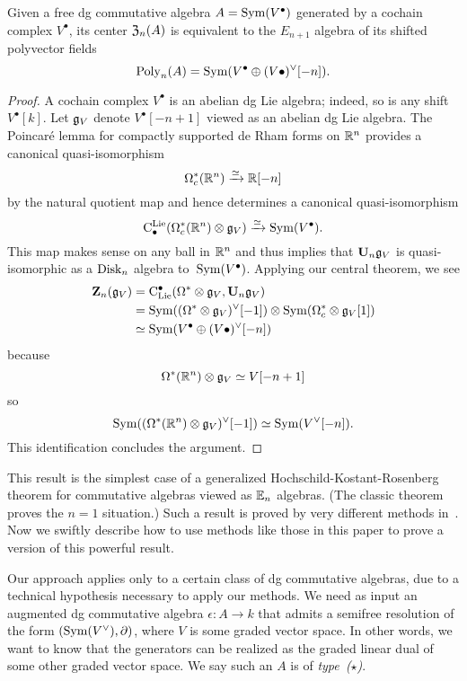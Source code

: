 \documentclass[11pt]{amsart}
\numberwithin{equation}{section}
\begin{document}
\begin{prp}
Given a free dg commutative algebra $A = {\rm Sym}(V^\bullet)$ generated by a cochain complex $V^\bullet$,
its center ${\frak Z}_n(A)$ is equivalent to the $E_{n+1}$ algebra of its shifted polyvector fields 
\[
{\rm Poly}_n(A) = {\rm Sym}(V^\bullet \oplus (V\bullet)^\vee[-n]).
\]
\end{prp}

\begin{proof}
A cochain complex $V^\bullet$ is an abelian dg Lie algebra;
indeed, so is any shift $V^\bullet[k]$. 
Let $\mathfrak g_V$ denote $V^\bullet[-n+1]$ viewed as an abelian dg Lie algebra.
The Poincar\'e lemma for compactly supported de Rham forms on $\mathbb R^n$ provides a canonical quasi-isomorphism
\[
\Omega^*_c(\mathbb R^n) \xrightarrow{\simeq} \mathbb R[-n]
\]
by the natural quotient map and hence determines a canonical quasi-isomorphism
\[
{\rm C}^{\rm Lie}_\bullet(\Omega^*_c(\mathbb R^n) \otimes \mathfrak g_V) \xrightarrow{\simeq} {\rm Sym}(V^\bullet).
\]
This map makes sense on any ball in $\mathbb R^n$ and thus implies that $\mathbf U_n \mathfrak g_V$ is quasi-isomorphic as a ${\rm Disk}_n$ algebra to~${\rm Sym}(V^\bullet)$.
Applying our central theorem, we see
\begin{align*}
\mathbf Z_n(\mathfrak g_V) &= {\rm C}_{\rm Lie}^\bullet(\Omega^* \otimes \mathfrak g_V, \mathbf U_n \mathfrak g_V) \\
&= {\rm Sym}((\Omega^* \otimes \mathfrak g_V)^\vee[-1]) \otimes {\rm Sym}(\Omega^*_c \otimes \mathfrak g_V[1])\\
& \simeq {\rm Sym}(V^\bullet \oplus (V\bullet)^\vee[-n])
\end{align*}
because
\[
\Omega^*(\mathbb R^n) \otimes \mathfrak g_V \simeq V[-n+1]
\]
so
\[
{\rm Sym}( (\Omega^*(\mathbb R^n) \otimes \mathfrak g_V)^\vee[-1]) \simeq {\rm Sym}( V^\vee[-n]).
\]
This identification concludes the argument.
\end{proof}

This result is the simplest case of a generalized Hochschild-Kostant-Rosenberg theorem for commutative algebras viewed as $\mathbb E_n$ algebras.
(The classic theorem proves the $n=1$ situation.)
Such a result is proved by very different methods in~\cite{CalWil}.
Now we swiftly describe how to use methods like those in this paper to prove a version of this powerful result.

Our approach applies only to a certain class of dg commutative algebras,
due to a technical hypothesis necessary to apply our methods.
We need as input an augmented dg commutative algebra $\epsilon: A \to k$ that admits a semifree resolution of the form $({\rm Sym}(V^\vee), \partial)$, where $V$ is some graded vector space.
In other words, we want to know that the generators can be realized as the graded linear dual of some other graded vector space.
We say such an $A$ is of {\em type~($\star$)}.
\end{document}
